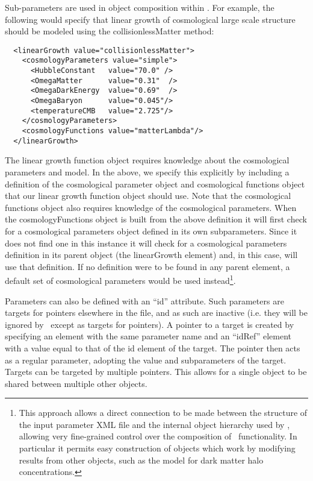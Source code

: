 Sub-parameters are used in object composition within \glc. For example, the following would specify that linear growth of cosmological large scale structure should be modeled using the {\normalfont \ttfamily collisionlessMatter} method:
\begin{verbatim}
  <linearGrowth value="collisionlessMatter">
    <cosmologyParameters value="simple">
      <HubbleConstant   value="70.0" />
      <OmegaMatter      value="0.31"  />
      <OmegaDarkEnergy  value="0.69"  />
      <OmegaBaryon      value="0.045"/>
      <temperatureCMB   value="2.725"/>
    </cosmologyParameters>
    <cosmologyFunctions value="matterLambda"/>
  </linearGrowth>
\end{verbatim}
The linear growth function object requires knowledge about the cosmological parameters and model. In the above, we specify this explicitly by including a definition of the cosmological parameter object and cosmological functions object that our linear growth function object should use. Note that the cosmological functions object also requires knowledge of the cosmological parameters. When the {\normalfont \ttfamily cosmologyFunctions} object is built from the above definition it will first check for a cosmological parameters object defined in its own subparameters. Since it does not find one in this instance it will check for a cosmological parameters definition in its parent object (the {\normalfont \ttfamily linearGrowth} element) and, in this case, will use that definition. If no definition were to be found in any parent element, a default set of cosmological parameters would be used instead\footnote{This approach allows a direct connection to be made between the structure of the input parameter XML file and the internal object hierarchy used by \glc, allowing very fine-grained control over the composition of \glc\ functionality. In particular it permits easy construction of objects which work by modifying results from other objects, such as the \protect{} model for dark matter halo concentrations.}.

Parameters can also be defined with an ``{\normalfont \ttfamily id}'' attribute. Such parameters are targets for pointers elsewhere in the file, and as such are inactive (i.e. they will be ignored by \glc\ except as targets for pointers). A pointer to a target is created by specifying an element with the same parameter name and an ``{\normalfont \ttfamily idRef}'' element with a value equal to that of the {\normalfont \ttfamily id} element of the target. The pointer then acts as a regular parameter, adopting the value and subparameters of the target. Targets can be targeted by multiple pointers. This allows for a single object to be shared between multiple other objects.

